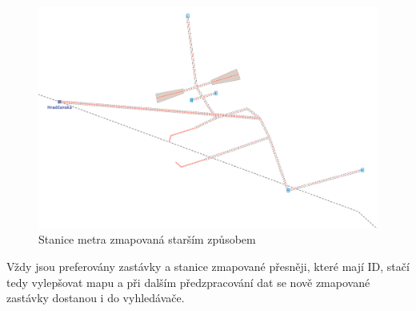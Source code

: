 \begin{figure}
  \centering
    \includegraphics[width=\textwidth]{../img/hradcanska.pdf}
  \caption{Stanice metra zmapovaná starším způsobem}
  \label{fig:metro-hrube}
\end{figure}

Vždy jsou preferovány zastávky a stanice zmapované přesněji, které mají ID,
stačí tedy vylepšovat mapu a při dalším předzpracování dat se nově zmapované
zastávky dostanou i do vyhledávače.

